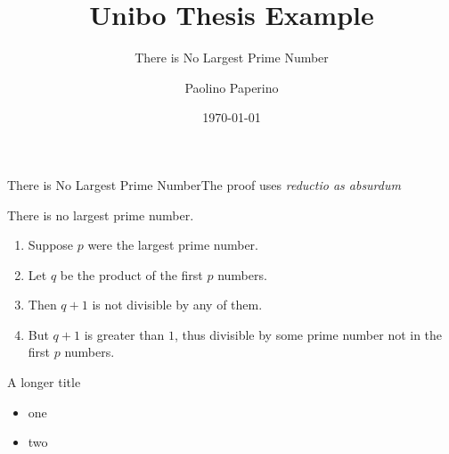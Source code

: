 \documentclass[slidescentered]{beamer}
\title{Unibo Thesis Example}
\subtitle{There is No Largest Prime Number}
\author{Paolino Paperino}
\date{\today}
\begin{document}
	\begin{frame}[noframenumbering]
		\titlepage
	\end{frame}


	\begin{frame}{There is No Largest Prime Number}{The proof uses \textit{reductio as absurdum}}

		\begin{theorem}
			There is no largest prime number.
		\end{theorem}

		\begin{enumerate}

  		\item<1-| alert@1> Suppose $p$ were the largest prime number.
  		\item<2-> Let $q$ be the product of the first $p$ numbers.
  		\item<3-> Then $q+1$ is not divisible by any of them.
  		\item<1-> But $q + 1$ is greater than $1$, thus divisible by some prime
  		number not in the first $p$ numbers.

		\end{enumerate}

	\end{frame}

	\begin{frame}{A longer title}

		\begin{itemize}
	  	\item one
	  	\item two
		\end{itemize}

	\end{frame}
\end{document}
